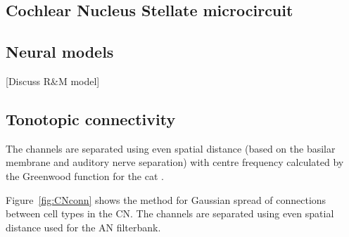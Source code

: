\begin{enumerate}



\section{Cochlear Nucleus Stellate microcircuit}

\subsection{Neural models}

[Discuss R\&M model]

\medskip{}

\subsection{Tonotopic connectivity}

The channels are separated using even spatial distance (based on the
basilar membrane and auditory nerve separation) with centre frequency
calculated by the Greenwood function for the cat
\citep{Greenwood:1990}. 

\medskip{}

Figure~\ref{fig:CNconn} shows the method for Gaussian spread of
connections between cell types in the CN\@.  The channels are separated
using even spatial distance used for the AN filterbank.



\end{enumerate}
